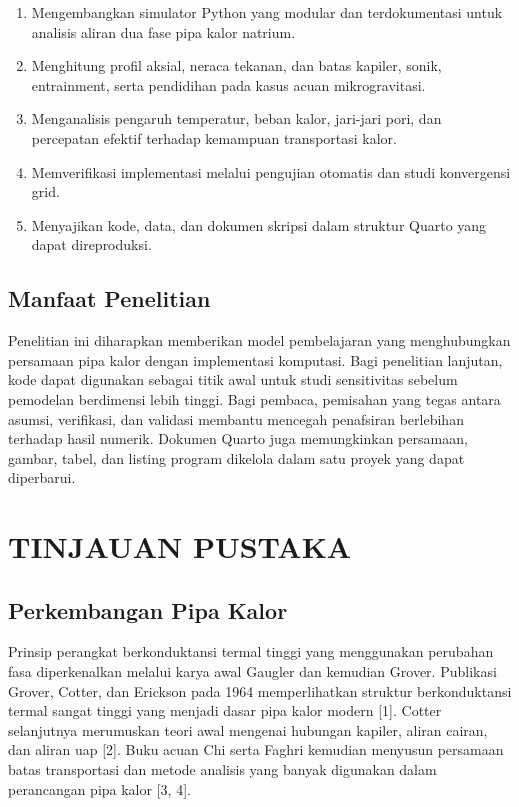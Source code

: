 \documentclass[
  12pt,
  12pt,a4paper,oneside]{report}
\providecommand{\tightlist}{%
  \setlength{\itemsep}{0pt}\setlength{\parskip}{0pt}}
\begin{document}
\begin{enumerate}
\def\labelenumi{\arabic{enumi}.}
\tightlist
\item
  Mengembangkan simulator Python yang modular dan terdokumentasi untuk
  analisis aliran dua fase pipa kalor natrium.
\item
  Menghitung profil aksial, neraca tekanan, dan batas kapiler, sonik,
  entrainment, serta pendidihan pada kasus acuan mikrogravitasi.
\item
  Menganalisis pengaruh temperatur, beban kalor, jari-jari pori, dan
  percepatan efektif terhadap kemampuan transportasi kalor.
\item
  Memverifikasi implementasi melalui pengujian otomatis dan studi
  konvergensi grid.
\item
  Menyajikan kode, data, dan dokumen skripsi dalam struktur Quarto yang
  dapat direproduksi.
\end{enumerate}

\hypertarget{manfaat-penelitian}{%
\section{Manfaat Penelitian}\label{manfaat-penelitian}}

Penelitian ini diharapkan memberikan model pembelajaran yang
menghubungkan persamaan pipa kalor dengan implementasi komputasi. Bagi
penelitian lanjutan, kode dapat digunakan sebagai titik awal untuk studi
sensitivitas sebelum pemodelan berdimensi lebih tinggi. Bagi pembaca,
pemisahan yang tegas antara asumsi, verifikasi, dan validasi membantu
mencegah penafsiran berlebihan terhadap hasil numerik. Dokumen Quarto
juga memungkinkan persamaan, gambar, tabel, dan listing program dikelola
dalam satu proyek yang dapat diperbarui.

\hypertarget{tinjauan-pustaka}{%
\chapter{TINJAUAN PUSTAKA}\label{tinjauan-pustaka}}

\hypertarget{perkembangan-pipa-kalor}{%
\section{Perkembangan Pipa Kalor}\label{perkembangan-pipa-kalor}}

Prinsip perangkat berkonduktansi termal tinggi yang menggunakan
perubahan fasa diperkenalkan melalui karya awal Gaugler dan kemudian
Grover. Publikasi Grover, Cotter, dan Erickson pada 1964 memperlihatkan
struktur berkonduktansi termal sangat tinggi yang menjadi dasar pipa
kalor modern {[}1{]}. Cotter selanjutnya merumuskan teori awal mengenai
hubungan kapiler, aliran cairan, dan aliran uap {[}2{]}. Buku acuan Chi
serta Faghri kemudian menyusun persamaan batas transportasi dan metode
analisis yang banyak digunakan dalam perancangan pipa kalor {[}3, 4{]}.
\end{document}
